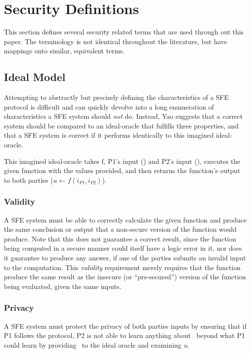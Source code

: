 \section{Security Definitions}

This section defines several security related terms that are used through out this paper.  The terminology is not identical throughout the literature, but have mappings onto similar, equivalent terms.

\subsection{Ideal Model}

Attempting to abstractly but precisely defining the characteristics of a \ac{SFE} protocol is difficult and can quickly devolve into a long enumeration of characteristics a \ac{SFE} system should \emph{not} do.  Instead, Yao suggests\cite{yao1986generate} that a correct system should be compared to an ideal-oracle that fulfills three properties, and that a \ac{SFE} system is correct if it performs identically to this imagined ideal-oracle.

This imagined ideal-oracle takes \ac{f}, \ac{P1}'s input (\ponein) and \ac{P2}'s input (\ptwoin), executes the given function with the values provided, and then returns the function's output to both parties ($u \leftarrow f(i_{P1}, i_{P2})$).

\subsubsection{Validity}

A \ac{SFE} system must be able to correctly calculate the given function and produce the same conclusion or output that a non-secure version of the function would produce. Note that this does not guarantee a correct result, since the function being computed in a secure manner could itself have a logic error in it, nor does it guarantee to produce any answer, if one of the parties submits an invalid input to the computation. This \emph{validity} requirement merely requires that the function produce the same result as the insecure (or ``pre-secured'') version of the function being evaluated, given the same inputs.

\subsubsection{Privacy}

A \ac{SFE} system must protect the privacy of both parties inputs by ensuring that if \ac{P1} follows the protocol, \ac{P2} is not able to learn anything about \ptwoin\ beyond what \ac{P1} could learn by providing \ponein\ to the ideal oracle and examining \emph{u}.

